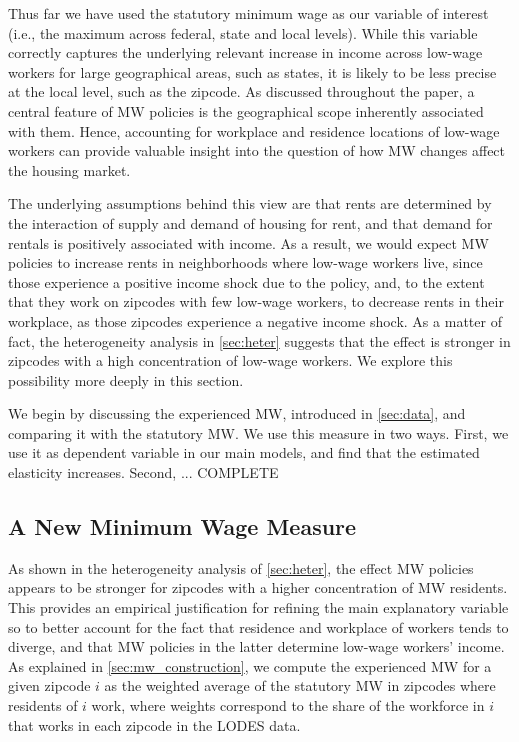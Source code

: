 
Thus far we have used the statutory minimum wage as our variable of interest (i.e., 
the maximum across federal, state and local levels). While this variable correctly 
captures the underlying relevant increase in income across low-wage workers for large
geographical areas, such as states, it is likely to be less precise at the local level, 
such as the zipcode. As discussed throughout the paper, a central feature of MW 
policies is the geographical scope inherently associated with them. Hence, accounting 
for workplace and residence locations of low-wage workers can provide valuable insight 
into the question of how MW changes affect the housing market. 

The underlying assumptions behind this view are that rents are determined by the 
interaction of supply and demand of housing for rent, and that demand for rentals is
positively associated with income. As a result, we would expect MW policies to increase 
rents in neighborhoods where low-wage workers live, since those experience a positive
income shock due to the policy, and, to the extent that they work on zipcodes with few 
low-wage workers, to decrease rents in their workplace, as those zipcodes experience
a negative income shock. As a matter of fact, the heterogeneity analysis in 
\autoref{sec:heter} suggests that the effect is stronger in zipcodes with a high
concentration of low-wage workers. We explore this possibility more deeply in this 
section.

We begin by discussing the experienced MW, introduced in \autoref{sec:data}, and 
comparing it with the statutory MW. We use this measure in two ways. First, we use
it as dependent variable in our main models, and find that the estimated elasticity 
increases. Second, ... COMPLETE

\subsection{A New Minimum Wage Measure}

As shown in the heterogeneity analysis of \autoref{sec:heter}, the effect MW policies 
appears to be stronger for zipcodes with a higher concentration of MW residents. This 
provides an empirical justification for refining the main explanatory variable so to 
better account for the fact that residence and workplace of workers tends to diverge, 
and that MW policies in the latter determine low-wage workers' income. As explained in 
\autoref{sec:mw_construction}, we compute the experienced MW for a given zipcode $i$ as 
the weighted average of the statutory MW in zipcodes where residents of $i$ work, where 
weights correspond to the share of the workforce in $i$ that works in each zipcode in 
the LODES data.

